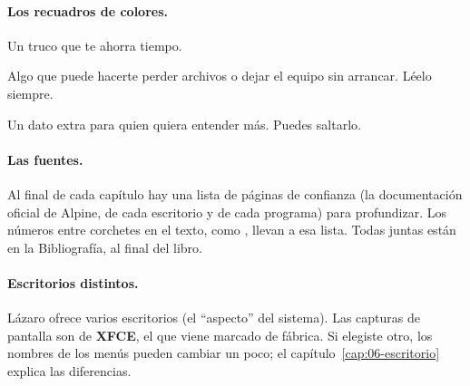 \paragraph{Los recuadros de colores.}
\begin{consejo}
Un truco que te ahorra tiempo.
\end{consejo}
\begin{cuidado}
Algo que puede hacerte perder archivos o dejar el equipo sin arrancar.
Léelo siempre.
\end{cuidado}
\begin{nota}
Un dato extra para quien quiera entender más. Puedes saltarlo.
\end{nota}

\paragraph{Las fuentes.} Al final de cada capítulo hay una lista de páginas
de confianza (la documentación oficial de Alpine, de cada escritorio y de
cada programa) para profundizar. Los números entre corchetes en el texto,
como \cite{alpine-about}, llevan a esa lista. Todas juntas están en la
Bibliografía, al final del libro.

\paragraph{Escritorios distintos.} Lázaro ofrece varios escritorios (el
\enquote{aspecto} del sistema). Las capturas de pantalla son de
\textbf{XFCE}, el que viene marcado de fábrica. Si elegiste otro, los
nombres de los menús pueden cambiar un poco; el capítulo~\ref{cap:06-escritorio}
explica las diferencias.
